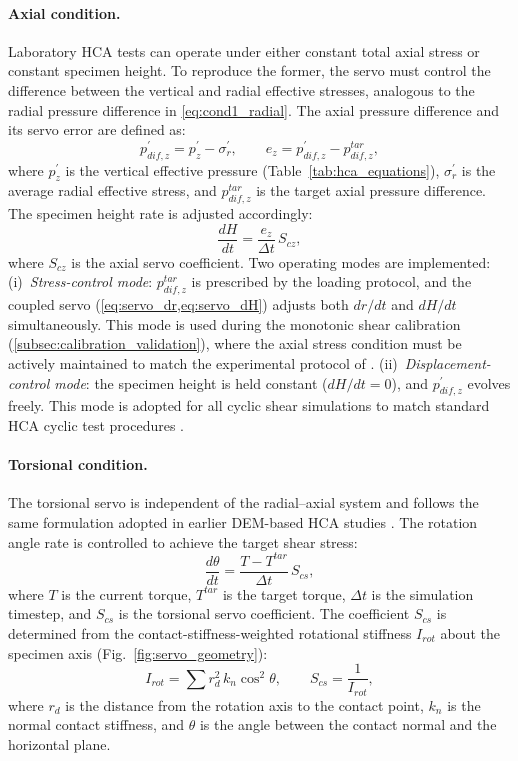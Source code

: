 \documentclass[a4paper,fleqn]{cas-sc}
\begin{document}
\paragraph{Axial condition.}
Laboratory HCA tests can operate under either constant total axial stress or constant specimen height. To reproduce the former, the servo must control the difference between the vertical and radial effective stresses, analogous to the radial pressure difference in \cref{eq:cond1_radial}. The axial pressure difference and its servo error are defined as:
\begin{equation}
p_{dif,z}^{\prime} = p_z^{\prime} - \sigma_r^{\prime}, \qquad e_z = p_{dif,z}^{\prime} - p_{dif,z}^{tar},
\label{eq:cond2_axial}
\end{equation}
where $p_z^{\prime}$ is the vertical effective pressure (Table~\ref{tab:hca_equations}), $\sigma_r^{\prime}$ is the average radial effective stress, and $p_{dif,z}^{tar}$ is the target axial pressure difference. The specimen height rate is adjusted accordingly:
\begin{equation}
\frac{dH}{dt} = \frac{e_z}{\Delta t}\,S_{cz},
\label{eq:servo_axial}
\end{equation}
where $S_{cz}$ is the axial servo coefficient. Two operating modes are implemented:
(i)~\emph{Stress-control mode}: $p_{dif,z}^{tar}$ is prescribed by the loading protocol, and the coupled servo (\cref{eq:servo_dr,eq:servo_dH}) adjusts both $dr/dt$ and $dH/dt$ simultaneously. This mode is used during the monotonic shear calibration (\cref{subsec:calibration_validation}), where the axial stress condition must be actively maintained to match the experimental protocol of \citet{Nakata1998}.
(ii)~\emph{Displacement-control mode}: the specimen height is held constant ($dH/dt=0$), and $p_{dif,z}^{\prime}$ evolves freely. This mode is adopted for all cyclic shear simulations to match standard HCA cyclic test procedures \citep{Ishihara1985}.

\paragraph{Torsional condition.}
The torsional servo is independent of the radial--axial system and follows the same formulation adopted in earlier DEM-based HCA studies \citep{Han2024jgs,Ma2024}. The rotation angle rate is controlled to achieve the target shear stress:
\begin{equation}
\frac{d\theta}{dt} = \frac{T - T^{tar}}{\Delta t}\,S_{cs},
\label{eq:cond3_torsion}
\end{equation}
where $T$ is the current torque, $T^{tar}$ is the target torque, $\Delta t$ is the simulation timestep, and $S_{cs}$ is the torsional servo coefficient. The coefficient $S_{cs}$ is determined from the contact-stiffness-weighted rotational stiffness $I_{rot}$ about the specimen axis (Fig.~\ref{fig:servo_geometry}):
\begin{equation}
I_{rot} = \sum r_d^2\,k_n\cos^2\!\theta, \qquad S_{cs} = \frac{1}{I_{rot}},
\label{eq:irot_scs}
\end{equation}
where $r_d$ is the distance from the rotation axis to the contact point, $k_n$ is the normal contact stiffness, and $\theta$ is the angle between the contact normal and the horizontal plane.
\end{document}
